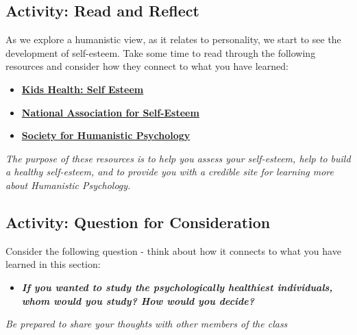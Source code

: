 \documentclass[
]{book}
\providecommand{\tightlist}{%
  \setlength{\itemsep}{0pt}\setlength{\parskip}{0pt}}
\begin{document}
\hypertarget{activity-read-and-reflect-4}{%
\subsection*{Activity: Read and Reflect}\label{activity-read-and-reflect-4}}

\begin{reflect}
As we explore a humanistic view, as it relates to personality, we start to see the development of self-esteem. Take some time to read through the following resources and consider how they connect to what you have learned:

\begin{itemize}
\tightlist
\item
  \href{https://kidshealth.org/en/kids/self-esteem.html}{\textbf{Kids Health: Self Esteem}}\\
\item
  \href{http://healthyselfesteem.org/}{\textbf{National Association for Self-Esteem}}\\
\item
  \href{https://www.apa.org/about/division/div32}{\textbf{Society for Humanistic Psychology}}
\end{itemize}

\emph{The purpose of these resources is to help you assess your self-esteem, help to build a healthy self-esteem, and to provide you with a credible site for learning more about Humanistic Psychology.}
\end{reflect}

\hypertarget{activity-question-for-consideration-3}{%
\subsection*{Activity: Question for Consideration}\label{activity-question-for-consideration-3}}

\begin{reflect}
Consider the following question - think about how it connects to what you have learned in this section:

\begin{itemize}
\tightlist
\item
  \textbf{\emph{If you wanted to study the psychologically healthiest individuals, whom would you study? How would you decide?}}
\end{itemize}

\emph{Be prepared to share your thoughts with other members of the class}
\end{reflect}
\end{document}
